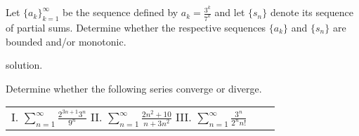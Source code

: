 \documentclass[handout]{ximera}
\begin{document}
\begin{problem}
Let $\{a_k\}_{k=1}^\infty$ be the sequence defined by $a_k = \frac{3^k}{7^k}$ and let $\{s_n\}$ denote its sequence of partial sums. Determine whether the respective sequences $\{a_k\}$ and $\{s_n\}$ are bounded and/or monotonic.
\end{problem}

\begin{freeResponse}
solution.
\end{freeResponse}

\begin{problem}
Determine whether the following series converge or diverge. 
\begin{center}
\begin{tabular}{lll}
I. $\sum_{n=1}^\infty \frac{2^{3n+1} 3^n}{9^n}$ \hspace{.3in} II. $\sum_{n=1}^\infty \frac{2n^2+10}{n+3n^2}$ \hspace{.3in} III. $\sum_{n=1}^\infty \frac{3^n}{2^n n!}$
\end{tabular}
\end{center}
\end{problem}
\end{document}
